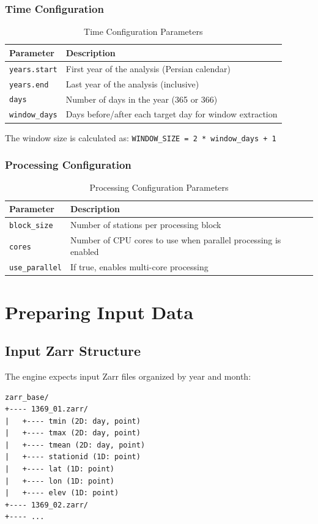 ﻿\documentclass[12pt,a4paper]{report}
\begin{document}
\subsubsection{Time Configuration}
\begin{table}[H]
    \centering
    \caption{Time Configuration Parameters}
    \begin{tabular}{p{4cm} p{8cm}}
        \toprule
        \textbf{Parameter} & \textbf{Description} \\
        \midrule
        \texttt{years.start} & First year of the analysis (Persian calendar) \\
        \texttt{years.end} & Last year of the analysis (inclusive) \\
        \texttt{days} & Number of days in the year (365 or 366) \\
        \texttt{window\_days} & Days before/after each target day for window extraction \\
        \bottomrule
    \end{tabular}
\end{table}
The window size is calculated as: \texttt{WINDOW\_SIZE = 2 * window\_days + 1}

\subsubsection{Processing Configuration}
\begin{table}[H]
    \centering
    \caption{Processing Configuration Parameters}
    \begin{tabular}{p{4cm} p{8cm}}
        \toprule
        \textbf{Parameter} & \textbf{Description} \\
        \midrule
        \texttt{block\_size} & Number of stations per processing block \\
        \texttt{cores} & Number of CPU cores to use when parallel processing is enabled \\
        \texttt{use\_parallel} & If true, enables multi-core processing \\
        \bottomrule
    \end{tabular}
\end{table}

\section{Preparing Input Data}
\subsection{Input Zarr Structure}
The engine expects input Zarr files organized by year and month:
\begin{lstlisting}[caption=Input Zarr Directory Structure]
zarr_base/
+---- 1369_01.zarr/
|   +---- tmin (2D: day, point)
|   +---- tmax (2D: day, point)
|   +---- tmean (2D: day, point)
|   +---- stationid (1D: point)
|   +---- lat (1D: point)
|   +---- lon (1D: point)
|   +---- elev (1D: point)
+---- 1369_02.zarr/
+---- ...
\end{lstlisting}
\end{document}
